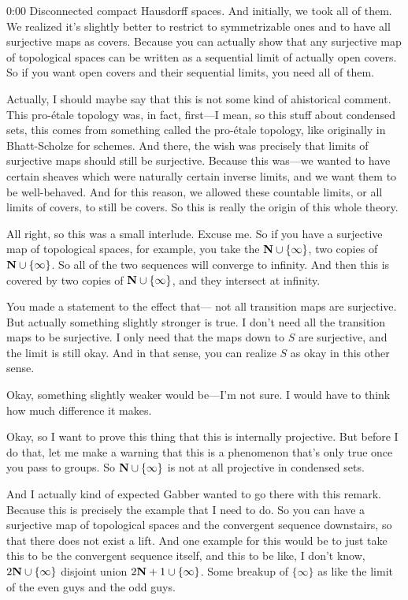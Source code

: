 \begin{unfinished}{0:00}
Disconnected compact Hausdorff spaces. And initially, we took all of them. We realized it's slightly better to restrict to symmetrizable ones and to have all surjective maps as covers. Because you can actually show that any surjective map of topological spaces can be written as a sequential limit of actually open covers. So if you want open covers and their sequential limits, you need all of them.

Actually, I should maybe say that this is not some kind of ahistorical comment. This pro-étale topology was, in fact, first---I mean, so this stuff about condensed sets, this comes from something called the pro-étale topology, like originally in Bhatt-Scholze for schemes. And there, the wish was precisely that limits of surjective maps should still be surjective. Because this was---we wanted to have certain sheaves which were naturally certain inverse limits, and we want them to be well-behaved. And for this reason, we allowed these countable limits, or all limits of covers, to still be covers. So this is really the origin of this whole theory.

All right, so this was a small interlude. Excuse me. So if you have a surjective map of topological spaces, for example, you take the $\mathbf N \cup \{\infty\}$, two copies of $\mathbf N \cup \{\infty\}$. So all of the two sequences will converge to infinity. And then this is covered by two copies of $\mathbf N \cup \{\infty\}$, and they intersect at infinity.

You made a statement to the effect that--- not all transition maps are surjective. But actually something slightly stronger is true. I don't need all the transition maps to be surjective. I only need that the maps down to $S$ are surjective, and the limit is still okay. And in that sense, you can realize $S$ as okay in this other sense.

Okay, something slightly weaker would be---I'm not sure. I would have to think how much difference it makes.

Okay, so I want to prove this thing that this is internally projective. But before I do that, let me make a warning that this is a phenomenon that's only true once you pass to groups. So $\mathbf N \cup \{\infty\}$ is not at all projective in condensed sets.

And I actually kind of expected Gabber wanted to go there with this remark. Because this is precisely the example that I need to do. So you can have a surjective map of topological spaces and the convergent sequence downstairs, so that there does not exist a lift. And one example for this would be to just take this to be the convergent sequence itself, and this to be like, I don't know, $2\mathbf N \cup \{\infty\}$ disjoint union $2\mathbf N+1 \cup \{\infty\}$. Some breakup of $\{\infty\}$ as like the limit of the even guys and the odd guys.


\end{unfinished}

